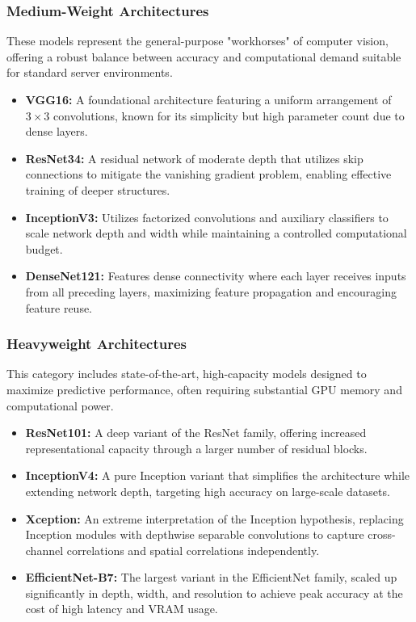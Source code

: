\documentclass[acmsmall]{acmart}
\begin{document}
\subsubsection{Medium-Weight Architectures}
These models represent the general-purpose "workhorses" of computer vision, offering a robust balance between accuracy and computational demand suitable for standard server environments.
\begin{itemize}
    \item \textbf{VGG16:} A foundational architecture featuring a uniform arrangement of $3\times3$ convolutions, known for its simplicity but high parameter count due to dense layers.
    \item \textbf{ResNet34:} A residual network of moderate depth that utilizes skip connections to mitigate the vanishing gradient problem, enabling effective training of deeper structures.
    \item \textbf{InceptionV3:} Utilizes factorized convolutions and auxiliary classifiers to scale network depth and width while maintaining a controlled computational budget.
    \item \textbf{DenseNet121:} Features dense connectivity where each layer receives inputs from all preceding layers, maximizing feature propagation and encouraging feature reuse.
\end{itemize}

\subsubsection{Heavyweight Architectures}
This category includes state-of-the-art, high-capacity models designed to maximize predictive performance, often requiring substantial GPU memory and computational power.
\begin{itemize}
    \item \textbf{ResNet101:} A deep variant of the ResNet family, offering increased representational capacity through a larger number of residual blocks.
    \item \textbf{InceptionV4:} A pure Inception variant that simplifies the architecture while extending network depth, targeting high accuracy on large-scale datasets.
    \item \textbf{Xception:} An extreme interpretation of the Inception hypothesis, replacing Inception modules with depthwise separable convolutions to capture cross-channel correlations and spatial correlations independently.
    \item \textbf{EfficientNet-B7:} The largest variant in the EfficientNet family, scaled up significantly in depth, width, and resolution to achieve peak accuracy at the cost of high latency and VRAM usage.
\end{itemize}
\end{document}
